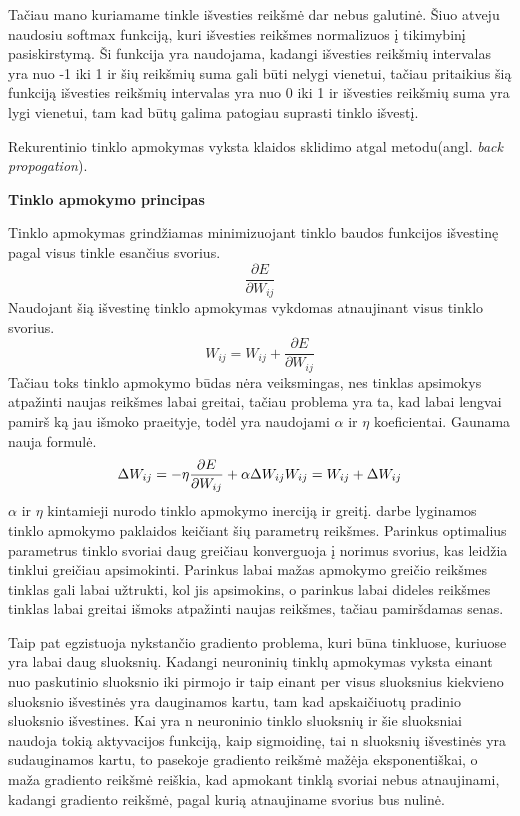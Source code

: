 Tačiau mano kuriamame tinkle išvesties reikšmė dar nebus galutinė. Šiuo atveju naudosiu softmax funkciją, kuri išvesties reikšmes normalizuos į tikimybinį pasiskirstymą. Ši funkcija yra naudojama, kadangi išvesties reikšmių intervalas yra nuo -1 iki 1 ir šių reikšmių suma gali būti nelygi vienetui, tačiau pritaikius šią funkciją išvesties reikšmių intervalas yra nuo 0 iki 1 ir išvesties reikšmių suma yra lygi vienetui, tam kad būtų galima patogiau suprasti tinklo išvestį.

Rekurentinio tinklo apmokymas vyksta klaidos sklidimo atgal metodu(angl. \textit{back propogation}).

\textbf{Tinklo apmokymo principas}

Tinklo apmokymas grindžiamas minimizuojant tinklo baudos funkcijos išvestinę pagal visus tinkle esančius svorius.
    \begin{equation*}
      \frac{\partial E}{\partial W_{ij}}
    \end{equation*}
Naudojant šią išvestinę tinklo apmokymas vykdomas atnaujinant visus tinklo svorius.
    \begin{equation*}
      W_{ij} = W_{ij} + \frac{\partial E}{\partial W_{ij}}
    \end{equation*}
Tačiau toks tinklo apmokymo būdas nėra veiksmingas, nes tinklas apsimokys atpažinti naujas reikšmes labai greitai, tačiau problema yra ta, kad labai lengvai pamirš ką jau išmoko praeityje, todėl yra naudojami $\alpha$ ir $\eta$ koeficientai. Gaunama nauja formulė.
\begin{equation*}
  \Delta W_{ij} =-\eta\frac{\partial E}{\partial W_{ij}}+\alpha \Delta W_{ij} \\
    W_{ij} = W_{ij} + \Delta W_{ij}
\end{equation*}
$\alpha$ ir $\eta$ kintamieji nurodo tinklo apmokymo inerciją ir greitį. \cite{Deividas2018} darbe lyginamos tinklo apmokymo paklaidos keičiant šių parametrų reikšmes. Parinkus optimalius parametrus tinklo svoriai daug greičiau konverguoja į norimus svorius, kas leidžia tinklui greičiau apsimokinti. Parinkus labai mažas apmokymo greičio reikšmes tinklas gali labai užtrukti, kol jis apsimokins, o parinkus labai dideles reikšmes tinklas labai greitai išmoks atpažinti naujas reikšmes, tačiau pamiršdamas senas.

Taip pat egzistuoja nykstančio gradiento problema, kuri būna tinkluose, kuriuose yra labai daug sluoksnių. Kadangi neuroninių tinklų apmokymas vyksta einant nuo paskutinio sluoksnio iki pirmojo ir taip einant per visus sluoksnius kiekvieno sluoksnio išvestinės yra dauginamos kartu, tam kad apskaičiuotų pradinio sluoksnio išvestines. Kai yra n neuroninio tinklo sluoksnių ir šie sluoksniai naudoja tokią aktyvacijos funkciją, kaip sigmoidinę, tai n sluoksnių išvestinės yra sudauginamos kartu, to pasekoje gradiento reikšmė mažėja eksponentiškai, o maža gradiento reikšmė reiškia, kad apmokant tinklą svoriai nebus atnaujinami, kadangi gradiento reikšmė, pagal kurią atnaujiname svorius bus nulinė.\cite{Wang2019}

